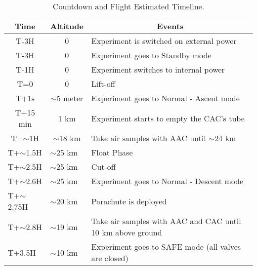\begin{table}[H]
\centering


\begin{tabular}{|l|l|l|}
\hline
\multicolumn{1}{|c|}{\textbf{Time}}       & \multicolumn{1}{c|}{\textbf{Altitude}}      & \multicolumn{1}{c|}{\textbf{Events}}                              \\ \hline
\multicolumn{1}{|c|}{T-3H}    & \multicolumn{1}{c|}{0}             & Experiment is switched on external power                                \\ \hline
\multicolumn{1}{|c|}{T-3H}    & \multicolumn{1}{c|}{0}             & Experiment goes to Standby mode                          \\ \hline
\multicolumn{1}{|c|}{T-1H}    & \multicolumn{1}{c|}{0}             & Experiment switches to internal power                                \\ \hline
\multicolumn{1}{|c|}{T=0}        & \multicolumn{1}{c|}{0}             & Lift-off                                                 \\ \hline
\multicolumn{1}{|c|}{T+1s}       & \multicolumn{1}{c|}{$\sim$5 meter} & Experiment goes to Normal - Ascent mode                  \\ \hline
\multicolumn{1}{|c|}{T+15 min}   & \multicolumn{1}{c|}{1 km}          & Experiment starts to empty the CAC's tube\\ \hline
\multicolumn{1}{|c|}{T+$\sim$1H} & \multicolumn{1}{c|}{$\sim$18 km}   & Take air samples with AAC until $\sim$24 km                       \\ \hline
T+$\sim$1.5H                     & $\sim$25 km                        & Float Phase                                           \\ \hline
T+$\sim$2.5H                     & $\sim$25 km                        & Cut-off                                                  \\ \hline
T+$\sim$2.6H                     & $\sim$25 km                        & Experiment goes to Normal - Descent mode                 \\ \hline
T+$\sim$2.75H                    & $\sim$20 km                        & Parachute is deployed                                    \\ \hline
T+$\sim$2.8H                     & $\sim$19 km                        & Take air samples with AAC and CAC until 10 km above ground                 \\ \hline
T+3.5H                           & $\sim$10 km                         & Experiment goes to SAFE mode (all valves are closed)                            \\ \hline
\end{tabular}
\caption{Countdown and Flight Estimated Timeline.}
\label{tab:countflight}
\end{table}
\raggedbottom